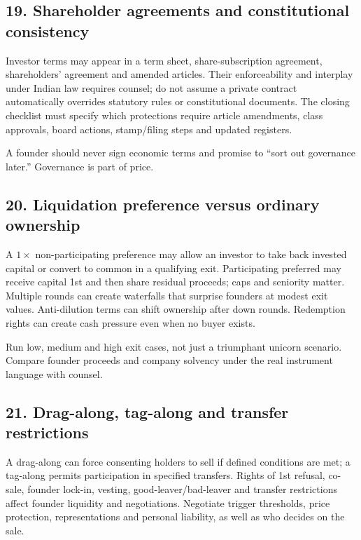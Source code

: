 \subsection{19. Shareholder agreements and constitutional consistency}

Investor terms may appear in a term sheet, share-subscription agreement, shareholders' agreement and amended articles. Their enforceability and interplay under Indian law requires counsel; do not assume a private contract automatically overrides statutory rules or constitutional documents. The closing checklist must specify which protections require article amendments, class approvals, board actions, stamp/filing steps and updated registers.

A founder should never sign economic terms and promise to ``sort out governance later.'' Governance is part of price.

\subsection{20. Liquidation preference versus ordinary ownership}

A $1\times$ non-participating preference may allow an investor to take back invested capital or convert to common in a qualifying exit. Participating preferred may receive capital 1st and then share residual proceeds; caps and seniority matter. Multiple rounds can create waterfalls that surprise founders at modest exit values. Anti-dilution terms can shift ownership after down rounds. Redemption rights can create cash pressure even when no buyer exists.

Run low, medium and high exit cases, not just a triumphant unicorn scenario. Compare founder proceeds and company solvency under the real instrument language with counsel.

\subsection{21. Drag-along, tag-along and transfer restrictions}

A drag-along can force consenting holders to sell if defined conditions are met; a tag-along permits participation in specified transfers. Rights of 1st refusal, co-sale, founder lock-in, vesting, good-leaver/bad-leaver and transfer restrictions affect founder liquidity and negotiations. Negotiate trigger thresholds, price protection, representations and personal liability, as well as who decides on the sale.

